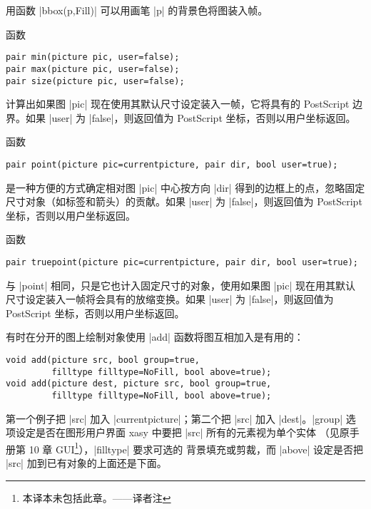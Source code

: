 \documentclass{ctexbook}
\makeatletter
\newenvironment{typelist}{\itemize
  \let\old@item\@item
  \def\@item[##1]{\expandafter\old@item[\ttfamily\color{type!50!black}##1]}}
{\enditemize}
\newcommand*\prgname[1]{\textsf{#1}}
\newcommand\transnote[1]{\footnote{#1——译者注}}
\makeatother
\begin{document}
\begin{typelist}
用函数 |bbox(p,Fill)| 可以用画笔 |p| 的背景色将图装入帧。

函数
\begin{lstlisting}
pair min(picture pic, user=false);
pair max(picture pic, user=false);
pair size(picture pic, user=false);
\end{lstlisting}
计算出如果图 |pic| 现在使用其默认尺寸设定装入一帧，它将具有的
\prgname{PostScript} 边界。如果 |user| 为 |false|，则返回值为
\prgname{PostScript} 坐标，否则以用户坐标返回。

函数
\begin{lstlisting}
pair point(picture pic=currentpicture, pair dir, bool user=true);
\end{lstlisting}
是一种方便的方式确定相对图 |pic| 中心按方向 |dir| 得到的边框上的点，忽略固定
尺寸对象（如标签和箭头）的贡献。如果 |user| 为 |false|，则返回值为
\prgname{PostScript} 坐标，否则以用户坐标返回。

函数
\begin{lstlisting}
pair truepoint(picture pic=currentpicture, pair dir, bool user=true);
\end{lstlisting}
与 |point| 相同，只是它也计入固定尺寸的对象，使用如果图 |pic| 现在用其默认
尺寸设定装入一帧将会具有的放缩变换。如果 |user| 为 |false|，则返回值为
\prgname{PostScript} 坐标，否则以用户坐标返回。

有时在分开的图上绘制对象使用 |add| 函数将图互相加入是有用的：
\begin{lstlisting}
void add(picture src, bool group=true,
         filltype filltype=NoFill, bool above=true);
void add(picture dest, picture src, bool group=true,
         filltype filltype=NoFill, bool above=true);
\end{lstlisting}
第一个例子把 |src| 加入 |currentpicture|；第二个把 |src| 加入 |dest|。|group|
选项设定是否在图形用户界面 \prgname{xasy} 中要把 |src| 所有的元素视为单个实体
（见原手册第 10 章 GUI\transnote{本译本未包括此章。}），|filltype| 要求可选的
背景填充或剪裁，而 |above| 设定是否把 |src| 加到已有对象的上面还是下面。


\end{typelist}
\end{document}
